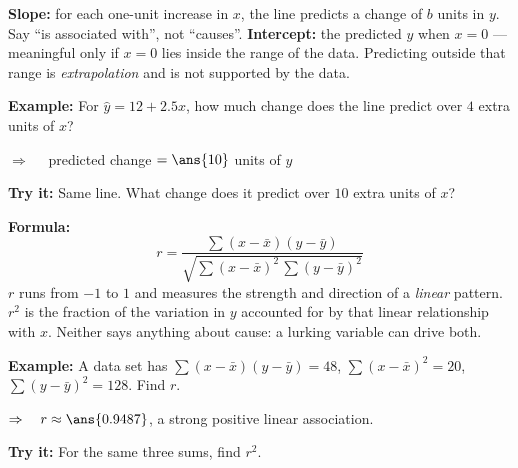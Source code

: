 \documentclass[12pt]{article}
\begin{document}

\begin{formulabox}
\textbf{Slope:} for each one-unit increase in $x$, the line predicts a change of $b$ units in
$y$. Say ``is associated with'', not ``causes''. \quad \textbf{Intercept:} the predicted $y$
when $x = 0$ --- meaningful only if $x = 0$ lies inside the range of the data. Predicting
outside that range is \emph{extrapolation} and is not supported by the data.
\end{formulabox}

\begin{examplebox}
\textbf{Example:} \quad For $\hat{y} = 12 + 2.5x$, how much change does the line predict over $4$ extra units of $x$?

$\Rightarrow\quad$ predicted change $= \ans{10}$ units of $y$
\end{examplebox}

\begin{tryitbox}
\textbf{Try it:} \quad Same line. What change does it predict over $10$ extra units of $x$?\\[2pt]
\end{tryitbox}


\begin{formulabox}
\textbf{Formula:}
\[ r = \frac{\sum(x-\bar{x})(y-\bar{y})}{\sqrt{\sum(x-\bar{x})^2\,\sum(y-\bar{y})^2}} \]
$r$ runs from $-1$ to $1$ and measures the strength and direction of a \emph{linear} pattern.
$r^2$ is the fraction of the variation in $y$ accounted for by that linear relationship with
$x$. Neither says anything about cause: a lurking variable can drive both.
\end{formulabox}

\begin{examplebox}
\textbf{Example:} \quad A data set has $\sum(x-\bar{x})(y-\bar{y}) = 48$, $\sum(x-\bar{x})^2 = 20$, $\sum(y-\bar{y})^2 = 128$. Find $r$.

$\Rightarrow\quad r \approx \ans{0.9487}$, a strong positive linear association.
\end{examplebox}

\begin{tryitbox}
\textbf{Try it:} \quad For the same three sums, find $r^2$.\\[2pt]
\end{tryitbox}
\end{document}
